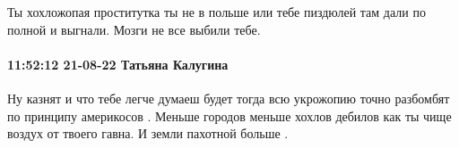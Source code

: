 Ты хохложопая проститутка ты не в польше или тебе пиздюлей там дали по полной и
выгнали. Мозги не все выбили тебе.

\paragraph{11:52:12 21-08-22 Татьяна Калугина}


Ну казнят и что тебе легче думаеш будет тогда всю укрожопию точно разбомбят по
принципу америкосов . Меньше городов меньше хохлов дебилов как ты чище воздух
от твоего гавна. И земли пахотной больше .


